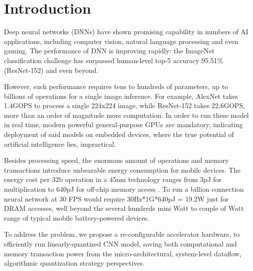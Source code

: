 \chapter{Introduction}
\label{ch:intro}

Deep neural networks (DNNs) have shown promising capability in numbers of AI applications, including computer vision, natural language processing and even gaming. The performance of DNN is improving rapidly: the ImageNet classification challenge has surpassed human-level top-5 accuracy 95.51\% (ResNet-152)\cite{ResNet} and even beyond.

However, such performance requires tens to hundreds of parameters, up to billions of operations for a single image inference. For example, AlexNet \cite{AlexNet} takes 1.4GOPS to process a single 224x224 image, while ResNet-152 takes
22.6GOPS, more than an order of magnitude more computation. In order to run these model in real time, modern powerful general-purpose GPUs are mandatory, indicating deployment of said models on embedded devices, where the true potential of artificial intelligence lies, impractical. 

Besides processing speed, the enormous amount of operations and memory transactions introduce unbearable energy consumption for mobile devices. The energy cost per 32b operation in a 45nm
technology ranges from 3pJ for multiplication to 640pJ for off-chip memory access \cite{EIE}. To run a billion
connection neural network at 30 FPS would require 30Hz*1G*640pJ = 19.2W just
for DRAM accesses, well beyond the several hundreds mini Watt to couple of Watt range of typical mobile battery-powered devices.

To address the problem, we propose a re-configurable accelerator hardware, to efficiently run linearly-quantized CNN model, saving both computational and memory transaction power from the micro-architectural, system-level dataflow, algorithmic quantization strategy perspectives.
